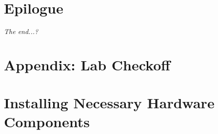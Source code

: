     \section*{Epilogue}                                                 \CombinationLockInstalled

    \textit{The end...?}

    \appendix

    \section{Appendix: Lab Checkoff}                                    

    \newpage

    \section{Installing Necessary Hardware Components} \label{sec:hardwareMods-mk4b}    


